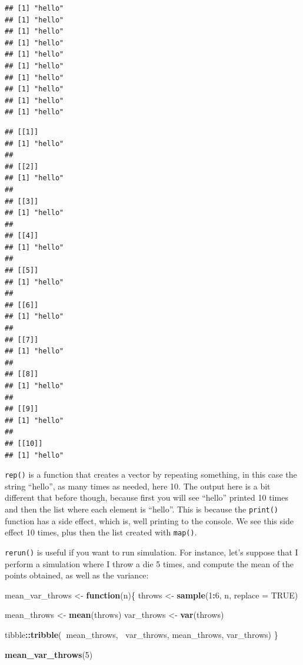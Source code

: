 \documentclass[]{gitbook}
\newenvironment{Shaded}{\begin{snugshade}}{\end{snugshade}}
\newcommand{\ControlFlowTok}[1]{\textcolor[rgb]{0.13,0.29,0.53}{\textbf{#1}}}
\newcommand{\DataTypeTok}[1]{\textcolor[rgb]{0.13,0.29,0.53}{#1}}
\newcommand{\DecValTok}[1]{\textcolor[rgb]{0.00,0.00,0.81}{#1}}
\newcommand{\KeywordTok}[1]{\textcolor[rgb]{0.13,0.29,0.53}{\textbf{#1}}}
\newcommand{\NormalTok}[1]{#1}
\newcommand{\OperatorTok}[1]{\textcolor[rgb]{0.81,0.36,0.00}{\textbf{#1}}}
\newcommand{\OtherTok}[1]{\textcolor[rgb]{0.56,0.35,0.01}{#1}}
\newcommand{\StringTok}[1]{\textcolor[rgb]{0.31,0.60,0.02}{#1}}
\begin{document}
\begin{verbatim}
## [1] "hello"
## [1] "hello"
## [1] "hello"
## [1] "hello"
## [1] "hello"
## [1] "hello"
## [1] "hello"
## [1] "hello"
## [1] "hello"
## [1] "hello"
\end{verbatim}

\begin{verbatim}
## [[1]]
## [1] "hello"
## 
## [[2]]
## [1] "hello"
## 
## [[3]]
## [1] "hello"
## 
## [[4]]
## [1] "hello"
## 
## [[5]]
## [1] "hello"
## 
## [[6]]
## [1] "hello"
## 
## [[7]]
## [1] "hello"
## 
## [[8]]
## [1] "hello"
## 
## [[9]]
## [1] "hello"
## 
## [[10]]
## [1] "hello"
\end{verbatim}

\texttt{rep()} is a function that creates a vector by repeating something, in this case the string ``hello'',
as many times as needed, here 10. The output here is a bit different that before though, because first
you will see ``hello'' printed 10 times and then the list where each element is ``hello''.
This is because the \texttt{print()} function has a side effect, which is, well printing to the console.
We see this side effect 10 times, plus then the list created with \texttt{map()}.

\texttt{rerun()} is useful if you want to run simulation. For instance, let's suppose that I perform a simulation
where I throw a die 5 times, and compute the mean of the points obtained, as well as the variance:

\begin{Shaded}
\begin{Highlighting}[]
\NormalTok{mean_var_throws <-}\StringTok{ }\ControlFlowTok{function}\NormalTok{(n)\{}
\NormalTok{  throws <-}\StringTok{ }\KeywordTok{sample}\NormalTok{(}\DecValTok{1}\OperatorTok{:}\DecValTok{6}\NormalTok{, n, }\DataTypeTok{replace =} \OtherTok{TRUE}\NormalTok{)}

\NormalTok{  mean_throws <-}\StringTok{ }\KeywordTok{mean}\NormalTok{(throws)}
\NormalTok{  var_throws <-}\StringTok{ }\KeywordTok{var}\NormalTok{(throws)}

\NormalTok{  tibble}\OperatorTok{::}\KeywordTok{tribble}\NormalTok{(}\OperatorTok{~}\NormalTok{mean_throws, }\OperatorTok{~}\NormalTok{var_throws,}
\NormalTok{                   mean_throws, var_throws)}
\NormalTok{\}}

\KeywordTok{mean_var_throws}\NormalTok{(}\DecValTok{5}\NormalTok{)}
\end{Highlighting}
\end{Shaded}
\end{document}
